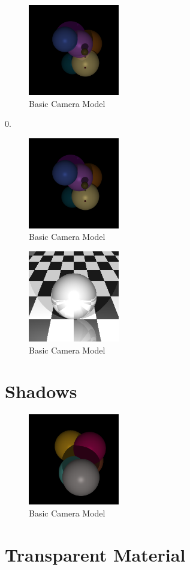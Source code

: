 \documentclass{article}
\begin{document}
\begin{figure}[H]
  \begin{center}
  \includegraphics[width=150px]{Images/reflectionsOn.png}
  \caption{Basic Camera Model}
  \label{fig:basiccammod}
  \end{center}
\end{figure}
0.
\begin{figure}[H]
  \begin{center}
  \includegraphics[width=150px]{Images/reflectionsOff.png}
  \caption{Basic Camera Model}
  \label{fig:basiccammod}
  \end{center}
\end{figure}

\begin{figure}[H]
  \begin{center}
  \includegraphics[width=150px]{Images/gridSphere.png}
  \caption{Basic Camera Model}
  \label{fig:basiccammod}
  \end{center}
\end{figure}

\section{Shadows}

\begin{figure}[H]
  \begin{center}
  \includegraphics[width=150px]{Images/shadows.png}
  \caption{Basic Camera Model}
  \label{fig:basiccammod}
  \end{center}
\end{figure}

\section{Transparent Material}



\end{document}
